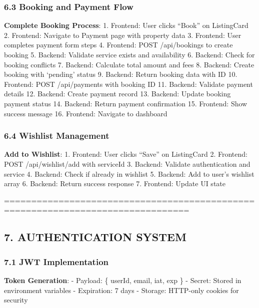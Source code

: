 \documentclass[12pt,a4paper]{article}
\begin{document}
\hypertarget{booking-and-payment-flow}{%
\subsubsection{6.3 Booking and Payment
Flow}\label{booking-and-payment-flow}}

\textbf{Complete Booking Process}: 1. Frontend: User clicks ``Book'' on
ListingCard 2. Frontend: Navigate to Payment page with property data 3.
Frontend: User completes payment form steps 4. Frontend: POST
/api/bookings to create booking 5. Backend: Validate service exists and
availability 6. Backend: Check for booking conflicts 7. Backend:
Calculate total amount and fees 8. Backend: Create booking with
`pending' status 9. Backend: Return booking data with ID 10. Frontend:
POST /api/payments with booking ID 11. Backend: Validate payment details
12. Backend: Create payment record 13. Backend: Update booking payment
status 14. Backend: Return payment confirmation 15. Frontend: Show
success message 16. Frontend: Navigate to dashboard

\hypertarget{wishlist-management}{%
\subsubsection{6.4 Wishlist Management}\label{wishlist-management}}

\textbf{Add to Wishlist}: 1. Frontend: User clicks ``Save'' on
ListingCard 2. Frontend: POST /api/wishlist/add with serviceId 3.
Backend: Validate authentication and service 4. Backend: Check if
already in wishlist 5. Backend: Add to user's wishlist array 6. Backend:
Return success response 7. Frontend: Update UI state

================================================================================

\hypertarget{authentication-system}{%
\subsection{7. AUTHENTICATION SYSTEM}\label{authentication-system}}

\hypertarget{jwt-implementation}{%
\subsubsection{7.1 JWT Implementation}\label{jwt-implementation}}

\textbf{Token Generation}: - Payload: \{ userId, email, iat, exp \} -
Secret: Stored in environment variables - Expiration: 7 days - Storage:
HTTP-only cookies for security
\end{document}
